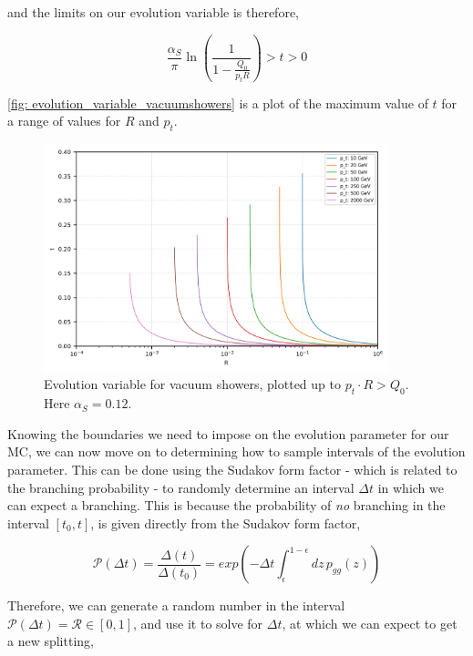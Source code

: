 \documentclass[main.tex]{subfiles}
\begin{document}
and the limits on our evolution variable is therefore, 

\begin{equation}\label{eqn: evolution_parameter_boundaries}
    \frac{\alpha_S}{\pi} \ln(\frac{1}{1 - \frac{Q_0}{p_t R}}) > t > 0
\end{equation}

\autoref{fig: evolution_variable_vacuumshowers} is a plot of the maximum value of \(t\) for a range of values for \(R\) and \(p_t\). 

\begin{figure}[h]
    \centering
    \includegraphics[width=10cm]{pictures/misc/evolution_variable_vacuumshowers.png}
    \caption{Evolution variable for vacuum showers, plotted up to \(p_t\cdot R > Q_0\). Here \(\alpha_S = 0.12\).}
    \label{fig: evolution_variable_vacuumshowers}
\end{figure}

Knowing the boundaries we need to impose on the evolution parameter for our MC, we can now move on to determining how to sample intervals of the evolution parameter.
This can be done using the Sudakov form factor - which is related to the branching probability - to randomly determine an interval \(\Delta t\) in which we can expect a branching. This is because the probability of \textit{no} branching in the interval \([t_0, t]\), is given directly from the Sudakov form factor,

\begin{equation}\label{eqn: branching_probability_from_sudakov}
    \mathcal{P}(\Delta t) = \frac{\Delta(t)}{\Delta(t_0)} = exp\left(-\Delta t \int_\epsilon^{1-\epsilon}dz \, p_{gg}(z)\right) 
\end{equation}

Therefore, we can generate a random number in the interval \(\mathcal{P}(\Delta t) = \mathcal{R} \in [0,1]\), and use it to solve for \(\Delta t\), at which we can expect to get a new splitting, 
\end{document}
